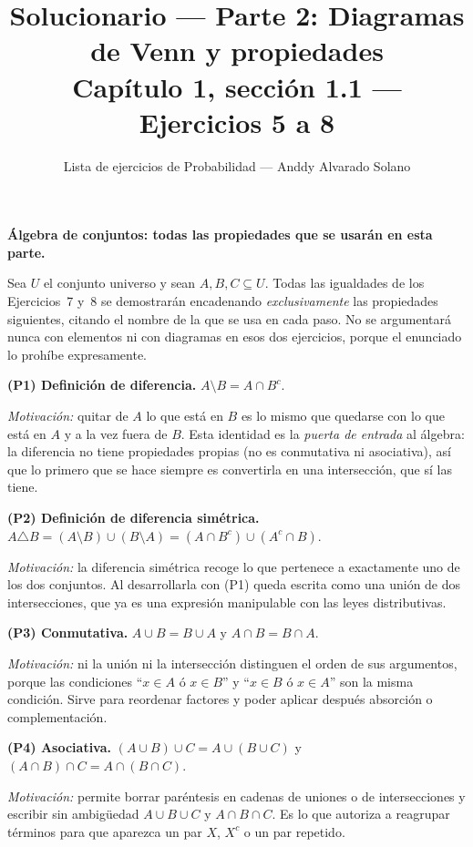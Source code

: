 \documentclass[11pt]{article}
\title{Solucionario --- Parte 2: Diagramas de Venn y propiedades\\ \large Capítulo 1, sección 1.1 --- Ejercicios 5 a 8}
\author{Lista de ejercicios de Probabilidad --- Anddy Alvarado Solano}
\date{}
\begin{document}
\maketitle

\begin{teo}
\textbf{Álgebra de conjuntos: todas las propiedades que se usarán en esta parte.}

Sea $U$ el conjunto universo y sean $A,B,C\subseteq U$. Todas las igualdades de los
Ejercicios~7 y~8 se demostrarán encadenando \emph{exclusivamente} las propiedades siguientes,
citando el nombre de la que se usa en cada paso. No se argumentará nunca con elementos ni con
diagramas en esos dos ejercicios, porque el enunciado lo prohíbe expresamente.

\medskip
\textbf{(P1) Definición de diferencia.} $A\setminus B=A\cap B^{c}$.

\emph{Motivación:} quitar de $A$ lo que está en $B$ es lo mismo que quedarse con lo que está
en $A$ y a la vez fuera de $B$. Esta identidad es la \emph{puerta de entrada} al álgebra: la
diferencia no tiene propiedades propias (no es conmutativa ni asociativa), así que lo primero
que se hace siempre es convertirla en una intersección, que sí las tiene.

\medskip
\textbf{(P2) Definición de diferencia simétrica.}
$A\triangle B=(A\setminus B)\cup(B\setminus A)=(A\cap B^{c})\cup(A^{c}\cap B)$.

\emph{Motivación:} la diferencia simétrica recoge lo que pertenece a exactamente uno de los dos
conjuntos. Al desarrollarla con (P1) queda escrita como una unión de dos intersecciones, que ya
es una expresión manipulable con las leyes distributivas.

\medskip
\textbf{(P3) Conmutativa.} $A\cup B=B\cup A$ \quad y \quad $A\cap B=B\cap A$.

\emph{Motivación:} ni la unión ni la intersección distinguen el orden de sus argumentos, porque
las condiciones ``$x\in A$ ó $x\in B$'' y ``$x\in B$ ó $x\in A$'' son la misma condición. Sirve
para reordenar factores y poder aplicar después absorción o complementación.

\medskip
\textbf{(P4) Asociativa.} $(A\cup B)\cup C=A\cup(B\cup C)$ \quad y \quad
$(A\cap B)\cap C=A\cap(B\cap C)$.

\emph{Motivación:} permite borrar paréntesis en cadenas de uniones o de intersecciones y
escribir sin ambigüedad $A\cup B\cup C$ y $A\cap B\cap C$. Es lo que autoriza a reagrupar
términos para que aparezca un par $X$, $X^{c}$ o un par repetido.


\end{teo}
\end{document}

